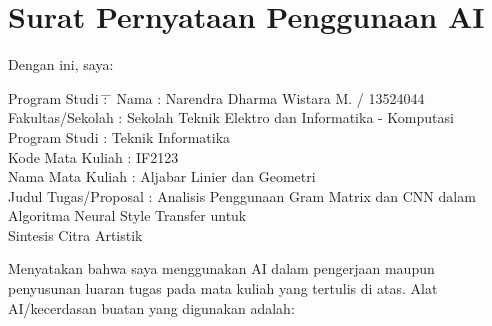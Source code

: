 \onecolumn 
\section*{\textbf{Surat Pernyataan Penggunaan AI}}
\justifying
\noindent Dengan ini, saya:
\begin{tabbing}
    Program Studi \hspace{1.5cm} \= : \hspace{0.5cm} \= \kill
    \indent Nama                    \> : \> Narendra Dharma Wistara M. / 13524044 \\
    \indent Fakultas/Sekolah        \> : \> Sekolah Teknik Elektro dan Informatika - Komputasi\\
    \indent Program Studi           \> : \> Teknik Informatika \\
    \indent Kode Mata Kuliah        \> : \> IF2123 \\
    \indent Nama Mata Kuliah        \> : \> Aljabar Linier dan Geometri \\
    \indent Judul Tugas/Proposal    \> : \> Analisis Penggunaan Gram Matrix dan CNN dalam Algoritma Neural Style Transfer untuk \\
    \> \> Sintesis Citra Artistik
\end{tabbing}

\noindent Menyatakan bahwa saya menggunakan AI dalam pengerjaan maupun penyusunan luaran tugas pada mata kuliah yang tertulis di atas. Alat AI/kecerdasan buatan yang digunakan adalah: 

